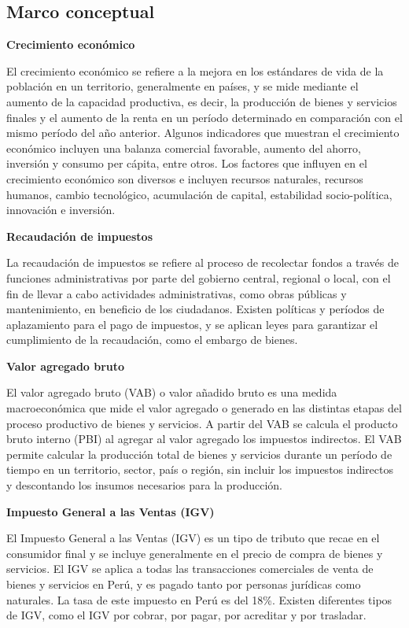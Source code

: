 \documentclass[
  jou,
  floatsintext,
  longtable,
  a4paper,
  nolmodern,
  notxfonts,
  notimes,
  12pt,
  colorlinks=true,linkcolor=blue,citecolor=blue,urlcolor=blue]{apa7}
\begin{document}
\subsection{Marco conceptual}\label{sec-marco-conceptual}

\textbf{Crecimiento económico}

El crecimiento económico se refiere a la mejora en los estándares de
vida de la población en un territorio, generalmente en países, y se mide
mediante el aumento de la capacidad productiva, es decir, la producción
de bienes y servicios finales y el aumento de la renta en un período
determinado en comparación con el mismo período del año anterior.
Algunos indicadores que muestran el crecimiento económico incluyen una
balanza comercial favorable, aumento del ahorro, inversión y consumo per
cápita, entre otros. Los factores que influyen en el crecimiento
económico son diversos e incluyen recursos naturales, recursos humanos,
cambio tecnológico, acumulación de capital, estabilidad socio-política,
innovación e inversión.

\textbf{Recaudación de impuestos}

La recaudación de impuestos se refiere al proceso de recolectar fondos a
través de funciones administrativas por parte del gobierno central,
regional o local, con el fin de llevar a cabo actividades
administrativas, como obras públicas y mantenimiento, en beneficio de
los ciudadanos. Existen políticas y períodos de aplazamiento para el
pago de impuestos, y se aplican leyes para garantizar el cumplimiento de
la recaudación, como el embargo de bienes.

\textbf{Valor agregado bruto}

El valor agregado bruto (VAB) o valor añadido bruto es una medida
macroeconómica que mide el valor agregado o generado en las distintas
etapas del proceso productivo de bienes y servicios. A partir del VAB se
calcula el producto bruto interno (PBI) al agregar al valor agregado los
impuestos indirectos. El VAB permite calcular la producción total de
bienes y servicios durante un período de tiempo en un territorio,
sector, país o región, sin incluir los impuestos indirectos y
descontando los insumos necesarios para la producción.

\textbf{Impuesto General a las Ventas (IGV)}

El Impuesto General a las Ventas (IGV) es un tipo de tributo que recae
en el consumidor final y se incluye generalmente en el precio de compra
de bienes y servicios. El IGV se aplica a todas las transacciones
comerciales de venta de bienes y servicios en Perú, y es pagado tanto
por personas jurídicas como naturales. La tasa de este impuesto en Perú
es del 18\%. Existen diferentes tipos de IGV, como el IGV por cobrar,
por pagar, por acreditar y por trasladar.
\end{document}
